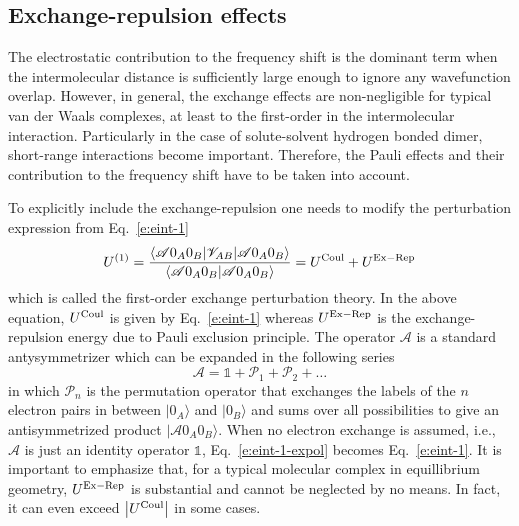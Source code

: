\documentclass[a4paper,titlepage,twoside,fleqn,12pt]{book}
\begin{document}
\begin{refsection}
\subsection{Exchange-repulsion effects}

The electrostatic contribution to the frequency shift is the dominant term 
when the intermolecular distance is sufficiently large enough to ignore 
any wavefunction overlap. However, in general, the exchange effects
are non\hyp{}negligible for typical van der Waals complexes, at least to the first\hyp{}order
in the intermolecular interaction. Particularly 
in the case of solute\hyp{}solvent hydrogen bonded dimer, 
short\hyp{}range interactions become important. 
Therefore, the Pauli effects and their contribution to the frequency shift have to be taken into account.

To explicitly include the exchange\hyp{}repulsion one needs to
modify the perturbation expression from Eq.~\eqref{e:eint-1}
%
\begin{equation} \label{e:eint-1-expol}
U^{(1)} = 
\frac{
\langle \mathscr{A} 0_A0_B \lvert \mathscr{V}_{AB} \rvert \mathscr{A} 0_A0_B \rangle 
}{
\langle \mathscr{A} 0_A0_B \vert \mathscr{A} 0_A0_B \rangle 
}
= U^{\rm Coul} + U^{\rm Ex-Rep}
\end{equation}
%
which is called the first\hyp{}order exchange perturbation theory.
In the above equation, $U^{\rm Coul}$ is given by Eq.~\eqref{e:eint-1}
whereas $U^{\rm Ex-Rep}$ is the exchange\hyp{}repulsion
energy due to Pauli exclusion principle.
The operator $\mathscr{A}$ is a standard antysymmetrizer which
can be expanded in the following series
%
\begin{equation} \label{e:antisymmetrizer-series}
 \mathscr{A} = \mathbb{1} + \mathscr{P}_1 + \mathscr{P}_2 + \ldots
\end{equation}
%
in which $\mathscr{P}_n$ is the permutation operator that exchanges the labels 
of the $n$ electron pairs in between $\vert 0_A \rangle$ and $\vert 0_B \rangle$
and sums over all possibilities to give an antisymmetrized product
$\vert \mathscr{A} 0_A0_B \rangle $. When no electron exchange is
assumed, i.e., $\mathscr{A}$ is just an identity operator $\mathbb{1}$, 
Eq.~\eqref{e:eint-1-expol} becomes Eq.~\eqref{e:eint-1}. It is important to emphasize that, for 
a typical molecular complex in equillibrium geometry, $U^{\rm Ex-Rep}$
is substantial and cannot be neglected by no means. In fact, it can even 
exceed $\left|U^{\rm Coul}\right|$ in some cases.


\end{refsection}
\end{document}
